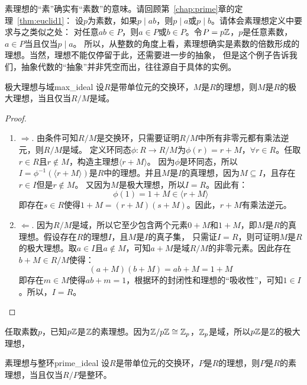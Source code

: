 \begin{example}
素理想的“素”确实有“素数”的意味。请回顾第~\ref{chap:prime}章的定理~\ref{thm:euclid1}：
设$p$为素数，如果$p \mid ab$，则$p \mid a$或$p \mid b$。请体会素理想定义中要求与之类似之处：
对任意$ab \in P$，则$a \in P$或$b \in P$。令$P=p {\mathbb Z}$，$p$是任意素数，$a \in P$当且仅当$p \mid a$。
所以，从整数的角度上看，素理想确实是素数的倍数形成的理想。当然，理想不能仅停留于此，还需要进一步的抽象，
但是这个例子告诉我们，抽象代数的“抽象”并非凭空而出，往往源自于具体的实例。
\end{example}

\begin{theorem}{极大理想与域}{max_ideal}
设$R$是带单位元的交换环，$M$是$R$的理想，则$M$是$R$的极大理想，当且仅当$R/M$是域。
\end{theorem}

\begin{proof}
\begin{enumerate}
\item $\Rightarrow$. 由条件可知$R/M$是交换环，只需要证明$R/M$中所有非零元都有乘法逆元，则$R/M$是域。%
定义环同态$\phi\colon R \to R/M$为$\phi(r) = r + M$，$\forall r \in R$。任取$r \in R$且$r \notin M$，构造主理想$\langle r + M \rangle$。
因为$\phi$是环同态，所以$I = \phi^{-1}(\langle r + M \rangle)$是$R$中的理想。并且$M$是$I$的真理想，因为$M \subseteq I$，且存在$r\in I$但是$r\notin M$。
又因为$M$是极大理想，所以$I = R$。因此有：\[\phi(1) = 1 + M \in \langle r + M \rangle\]
即存在$s \in R$使得$1 + M = (r + M) (s + M)$。因此，$r + M$有乘法逆元。

\item $\Leftarrow$. 因为$R/M$是域，所以它至少包含两个元素$0 + M$和$1 + M$，即$M$是$R$的真理想。假设存在$R$的理想$I$，且$M$是$I$的真子集，
只需证$I = R$，则可证明$M$是$R$的极大理想。取$a \in I$且$a \notin M$，可知$a + M$是域$R/M$的非零元素。因此存在$b + M \in R/M$使得：
\[(a +M)(b +M) = ab +M = 1 + M \]
即存在$m \in M$使得$ ab + m = 1$，根据环的封闭性和理想的“吸收性”，可知$1 \in I$。所以，$I = R$。
\end{enumerate}
\end{proof}

\begin{example}
任取素数$p$，已知$p {\mathbb Z}$是${\mathbb Z}$的素理想。因为${\mathbb Z} / p{\mathbb Z} \cong {\mathbb Z}_p$，${\mathbb Z}_p$是域，所以$p {\mathbb Z}$是${\mathbb Z}$的极大理想，
\end{example}

\begin{theorem}{素理想与整环}{prime_ideal}
设$R$是带单位元的交换环，$P$是$R$的理想，则$P$是$R$的素理想，当且仅当$R/P$是整环。
\end{theorem}

